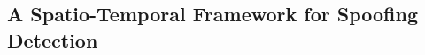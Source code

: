\documentclass[11pt]{article}
\begin{document}


\subsection{A Spatio-Temporal Framework for Spoofing Detection}
\label{sec:spoofer_timeline}
\end{document}
